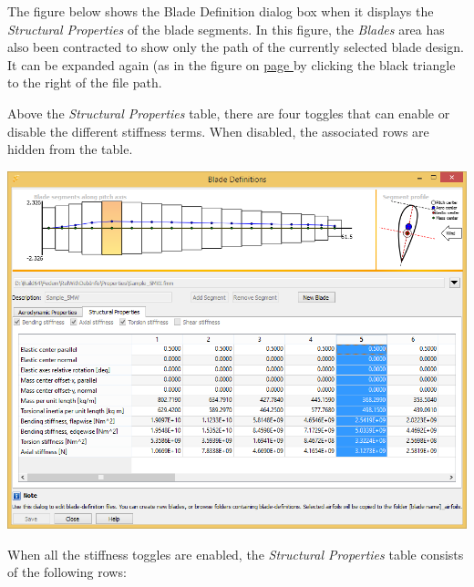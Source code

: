 The figure below shows the Blade Definition dialog box when it displays
the {\sl Structural Properties} of the blade segments. In this figure,
the {\sl Blades} area has also been contracted to show only the path of
the currently selected blade design. It can be expanded again (as in the
figure on \hyperref[blade-definition]{page } by clicking the black
triangle to the right of the file path.

Above the {\sl Structural Properties} table, there are four toggles
that can enable or disable the different stiffness terms. When disabled,
the associated rows are hidden from the table.


\noindent\includegraphics[width=\textwidth]{Figures/3b-BladeDefinition2}

When all the stiffness toggles are enabled, the {\sl Structural Properties}
table consists of the following rows:

